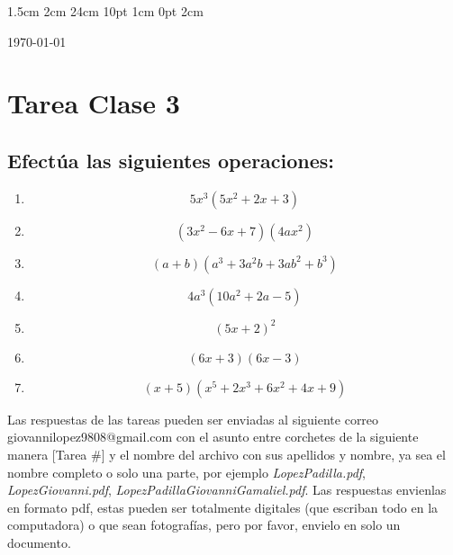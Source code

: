 \documentclass[12pt,letterpaper]{report}
\begin{document}
\setmargins{2.5cm}      
{1.5cm}                     
{2cm}  
{24cm}                    
{10pt}                          
{1cm}                          
{0pt}                             
{2cm}
\begin{flushright}
\today
\end{flushright}
\vspace{-1.75cm}
\section*{Tarea Clase 3}
\subsection*{Efectúa las siguientes operaciones:}
\begin{enumerate}
\item \begin{equation*}
5x^3(5x^2+2x+3)    
\end{equation*}
\item \begin{equation*}
    (3x^2-6x+7)(4ax^2)
\end{equation*}
\item \begin{equation*}
    (a+b)(a^3+3a^2b+3ab^2+b^3)
\end{equation*}
\item \begin{equation*}
    4a^3(10a^2+2a-5)
\end{equation*}
\item \begin{equation*}
    (5x+2)^2
\end{equation*}
\item \begin{equation*}
    (6x+3)(6x-3)
\end{equation*}
\item \begin{equation*}
    (x+5)(x^5+2x^3+6x^2+4x+9)
\end{equation*}
\end{enumerate}
Las respuestas de las tareas pueden ser enviadas al siguiente correo giovannilopez9808@gmail.com con el asunto entre corchetes de la siguiente manera [Tarea #] y el nombre del archivo con sus apellidos y nombre, ya sea el nombre completo o solo una parte, por ejemplo \textit{LopezPadilla.pdf}, \textit{LopezGiovanni.pdf}, \textit{LopezPadillaGiovanniGamaliel.pdf}. Las respuestas envienlas en formato pdf, estas pueden ser totalmente digitales (que escriban todo en la computadora) o que sean fotografías, pero por favor, envielo en solo un documento.
\end{document}
